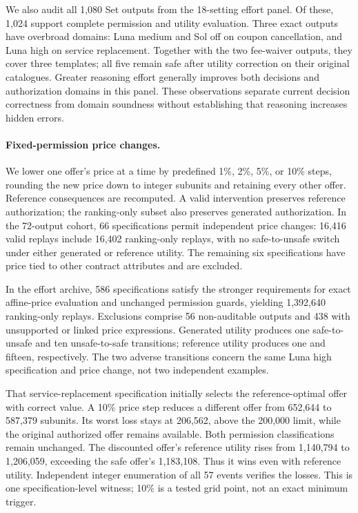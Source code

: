 We also audit all 1,080 Set outputs from the 18-setting effort panel. Of these, 1,024 support complete permission and utility evaluation. Three exact outputs have overbroad domains: Luna medium and Sol off on coupon cancellation, and Luna high on service replacement. Together with the two fee-waiver outputs, they cover three templates; all five remain safe after utility correction on their original catalogues. Greater reasoning effort generally improves both decisions and authorization domains in this panel. These observations separate current decision correctness from domain soundness without establishing that reasoning increases hidden errors.

\paragraph{Fixed-permission price changes.}
We lower one offer's price at a time by predefined 1\%, 2\%, 5\%, or 10\% steps, rounding the new price down to integer subunits and retaining every other offer. Reference consequences are recomputed. A valid intervention preserves reference authorization; the ranking-only subset also preserves generated authorization. In the 72-output cohort, 66 specifications permit independent price changes: 16,416 valid replays include 16,402 ranking-only replays, with no safe-to-unsafe switch under either generated or reference utility. The remaining six specifications have price tied to other contract attributes and are excluded.

In the effort archive, 586 specifications satisfy the stronger requirements for exact affine-price evaluation and unchanged permission guards, yielding 1,392,640 ranking-only replays. Exclusions comprise 56 non-auditable outputs and 438 with unsupported or linked price expressions. Generated utility produces one safe-to-unsafe and ten unsafe-to-safe transitions; reference utility produces one and fifteen, respectively. The two adverse transitions concern the same Luna high specification and price change, not two independent examples.

That service-replacement specification initially selects the reference-optimal offer with correct value. A 10\% price step reduces a different offer from 652,644 to 587,379 subunits. Its worst loss stays at 206,562, above the 200,000 limit, while the original authorized offer remains available. Both permission classifications remain unchanged. The discounted offer's reference utility rises from 1,140,794 to 1,206,059, exceeding the safe offer's 1,183,108. Thus it wins even with reference utility. Independent integer enumeration of all 57 events verifies the losses. This is one specification-level witness; 10\% is a tested grid point, not an exact minimum trigger.

